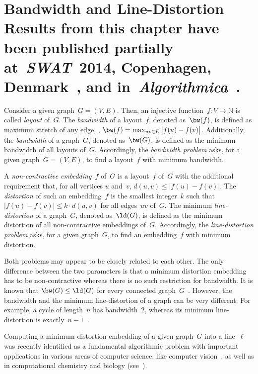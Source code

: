 \chapter
[%
    Bandwidth and Line-Distortion%
]
{%
    Bandwidth and Line-Distortion%
    \chapterNote
    {
        Results from this chapter have been published partially
        at~\emph{SWAT}~2014, Copenhagen, Denmark~\cite{DragKoehLeit2014}, and
        in~\emph{Algorithmica}~\cite{DragKoehLeit2017}.
    }%
}
    \label{cha:bandwidthLineDist}
%

Consider a given graph~$G = (V, E)$.
Then, an injective function~$f \colon V \rightarrow \mathbb{N}$ is called \emph{layout} of~$G$.
The \emph{bandwidth} of a layout~$f$, denoted as~$\bw(f)$, is defined as maximum stretch of any edge, \ie, $\bw(f) = \max_{uv \in E} \big| f(u) - f(v) \big|$.
Additionally, the \emph{bandwidth} of a graph~$G$, denoted as~$\bw(G)$, is defined as the minimum bandwidth of all layouts of~$G$.
Accordingly, the \emph{bandwidth problem} asks, for a given graph~$G = (V, E)$, to find a layout~$f$ with minimum bandwidth.

A \emph{non-contractive embedding~\( f \)} of~$G$ is a layout~$f$ of~$G$ with the additional requirement that, for all vertices $u$ and~$v$, $d(u, v) \leq \big| f(u) - f(v) \big|$.
The \emph{distortion} of such an embedding~$f$ is the smallest integer~$k$ such that $\big| f(u) - f(v) \big| \leq k \cdot d(u, v)$ for all edges~$uv$ of~$G$.
The minimum \emph{line-distortion} of a graph~$G$, denoted as~$\ld(G)$, is defined as the minimum distortion of all non-contractive embeddings of~$G$.
Accordingly, the \emph{line-distortion problem} asks, for a given graph~$G$, to find an embedding~$f$ with minimum distortion.

Both problems may appear to be closely related to each other.
The only difference between the two parameters is that a minimum distortion embedding has to be non-contractive whereas there is no such restriction for bandwidth.
It is known that $\bw(G) \leq \ld(G)$ for every connected graph~$G$~\cite{HeggMeisPros2011}.
However, the bandwidth and the minimum line-distortion of a graph can be very different.
For example, a cycle of length~$n$ has bandwidth~$2$, whereas its minimum line-distortion is exactly~$n - 1$~\cite{HeggMeisPros2011}.

Computing a minimum distortion embedding of a given graph~$G$ into a line~$\ell$ was recently identified as a fundamental algorithmic problem with important applications in various areas of computer science, like computer vision~\cite{TeneSilvLang2000}, as well as in computational chemistry and biology (see~\cite{Indyk2001,IndykMatous2004}).

